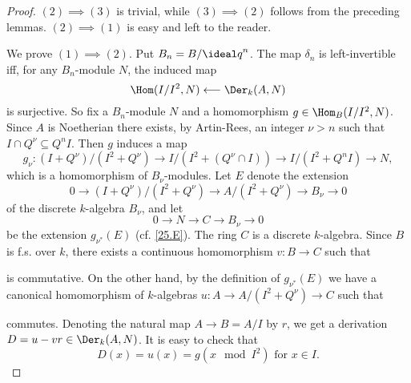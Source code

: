 \documentclass[../main]{subfiles}
\begin{document}
\begin{proof}
$(2) \implies (3)$ is trivial, while $(3) \implies (2)$ follows from the preceding lemmas. $(2) \implies (1)$ is easy and left to the reader. 

We prove $(1) \implies (2)$. Put $B_n = B/{\ideal q}^n$. The map $\delta_n$ is left-invertible iff, for any $B_n$-module $N$, the induced map \[\Hom(I/I^2, N) \longleftarrow \Der_k(A, N)\] is surjective. So fix a $B_n$-module $N$ and a homomorphism $g \in \Hom_B(I/I^2, N)$. Since $A$ is Noetherian there exists, by Artin-Rees, an integer $\nu > n$ such that $I \cap Q^\nu \subseteq Q^n I$. Then $g$ induces a map \[g_\nu : (I + Q^\nu)/(I^2 + Q^\nu) \longrightarrow I/(I^2 + (Q^\nu \cap I)) \longrightarrow I/(I^2 + Q^n I) \longrightarrow N,\] which is a homomorphism of $B_\nu$-modules. Let $E$ denote the extension
\[
0 \longrightarrow (I + Q^\nu)/(I^2 + Q^\nu) \longrightarrow A/(I^2 + Q^\nu) \longrightarrow B_\nu \longrightarrow 0
\]
of the discrete $k$-algebra $B_\nu$, and let
\[
0 \longrightarrow N \longrightarrow C \longrightarrow B_\nu \longrightarrow 0
\]
be the extension $g_{\nu^\ast}(E)$ (cf. \ref{25.E}). The ring $C$ is a discrete $k$-algebra. Since $B$ is f.s. over $k$, there exists a continuous homomorphism $v : B \longrightarrow C$ such that

\begin{center}
\end{center}

is commutative. On the other hand, by the definition of $g_{\nu^\ast}(E)$ we have a canonical homomorphism of $k$-algebras $u : A \longrightarrow A/(I^2 + Q^\nu) \longrightarrow C$ such that

\begin{center}
\end{center}

commutes. Denoting the natural map $A \longrightarrow B = A/I$ by $r$, we get a derivation $D = u - vr \in \Der_k(A, N)$. It is easy to check that \[D(x) = u(x) = g(x \mod I^2)\text{ for }x \in I.\] 
\end{proof}
\end{document}

